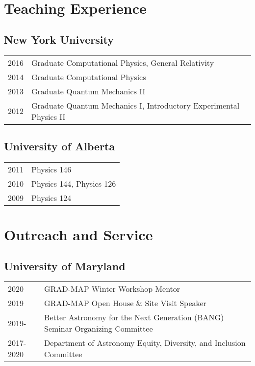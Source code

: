 \documentclass[letterpaper]{article}
\renewenvironment{itemize}{
  \begin{list}{}{
    \setlength{\leftmargin}{1.5em}
  }
}{
  \end{list}
}
\begin{document}
\begin{itemize}
\end{itemize}

\section*{Teaching Experience}
\subsection*{New York University}
\begin{itemize}
\item \begin{tabular}{ll}
2016 & Graduate Computational Physics, General Relativity \\
2014 & Graduate Computational Physics \\
2013 & Graduate Quantum Mechanics II \\
2012 & Graduate Quantum Mechanics I, Introductory Experimental Physics II
\end{tabular}
\end{itemize}
\subsection*{University of Alberta}
\begin{itemize}
\item \begin{tabular}{ll}
2011 & Physics 146 \\
2010 & Physics 144, Physics 126 \\
2009 & Physics 124 \\
\end{tabular}
\end{itemize}

\section*{Outreach and Service}
\subsection*{University of Maryland}
\begin{itemize}
\item \begin{tabular}{ll}
2020			& GRAD-MAP Winter Workshop Mentor \\
2019			& GRAD-MAP Open House \& Site Visit Speaker \\
2019-		& Better Astronomy for the Next Generation (BANG) Seminar Organizing Committee \\
2017-2020 	& Department of Astronomy Equity, Diversity, and Inclusion Committee
\end{tabular}
\end{itemize}
\end{document}
